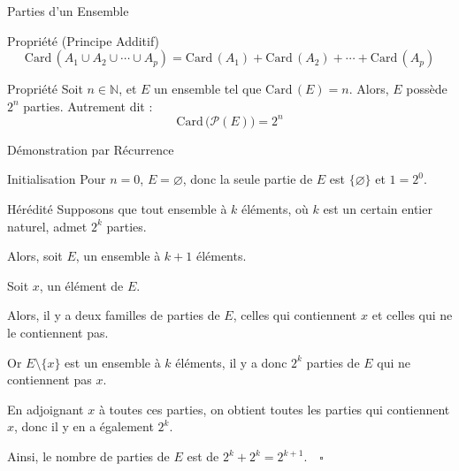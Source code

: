 \documentclass{cours}
\begin{document}
\begin{Gpartie}{Parties d'un Ensemble}
\begin{Spartie}{Propriété (Principe Additif)}
            \[\mathrm{Card}\,\left(A_1\cup A_2\cup\dotsb\cup A_p\right)=\mathrm{Card}\,(A_1)+\mathrm{Card}\,(A_2)+\dotsb+\mathrm{Card}\,\left(A_p\right)\]
        \end{Spartie}
        \begin{Spartie}{Propriété}
            Soit $n\in\mathbb{N}$, et $E$ un ensemble tel que $\mathrm{Card}\,(E)=n$. Alors, $E$ possède $2^n$ parties. Autrement dit :
            \[\mathrm{Card}\,\big(\mathcal{P}(E)\big)=2^n\]
            \begin{SSpartie}{Démonstration par Récurrence}
                \begin{SSSpartie}{Initialisation}
                    Pour $n=0$, $E=\varnothing$, donc la seule partie de $E$ est $\big\{\varnothing\big\}$ et $1=2^0$.
                \end{SSSpartie}
                \begin{SSSpartie}{Hérédité}
                    Supposons que tout ensemble à $k$ éléments, où $k$ est un certain entier naturel, admet $2^k$ parties.

                    Alors, soit $E$, un ensemble à $k+1$ éléments.

                    Soit $x$, un élément de $E$.

                    Alors, il y a deux familles de parties de $E$, celles qui contiennent $x$ et celles qui ne le contiennent pas.

                    Or $E\setminus\big\{x\big\}$ est un ensemble à $k$ éléments, il y a donc $2^k$ parties de $E$ qui ne contiennent pas $x$.

                    En adjoignant $x$ à toutes ces parties, on obtient toutes les parties qui contiennent $x$, donc il y en a également $2^k$.
                    
                    Ainsi, le nombre de parties de $E$ est de $2^k+2^k=2^{k+1}$.$\quad\square$
                \end{SSSpartie}
            \end{SSpartie}
        \end{Spartie}
    \end{Gpartie}
\end{document}

